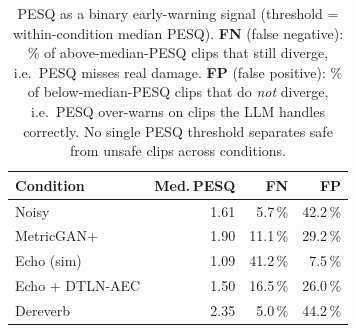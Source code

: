 \begin{table}[t]
  \centering
  \begin{tabular}{lrrr}
    \hline
    \textbf{Condition} & \textbf{Med.\,PESQ} & \textbf{FN} & \textbf{FP} \\
    \hline
    Noisy        & 1.61 & 5.7\,\%  & 42.2\,\% \\
    MetricGAN+   & 1.90 & 11.1\,\% & 29.2\,\% \\
    Echo (sim)   & 1.09 & 41.2\,\% & 7.5\,\%  \\
    Echo + DTLN-AEC & 1.50 & 16.5\,\% & 26.0\,\% \\
    Dereverb     & 2.35 & 5.0\,\%  & 44.2\,\% \\
    \hline
  \end{tabular}
  \caption{PESQ as a binary early-warning signal (threshold =
    within-condition median PESQ). \textbf{FN} (false negative):
    \% of above-median-PESQ clips that still diverge, i.e.\ PESQ
    misses real damage. \textbf{FP} (false positive): \% of
    below-median-PESQ clips that do \emph{not} diverge, i.e.\ PESQ
    over-warns on clips the LLM handles correctly. No single PESQ
    threshold separates safe from unsafe clips across conditions.}
  \label{tab:metricfail}
\end{table}
